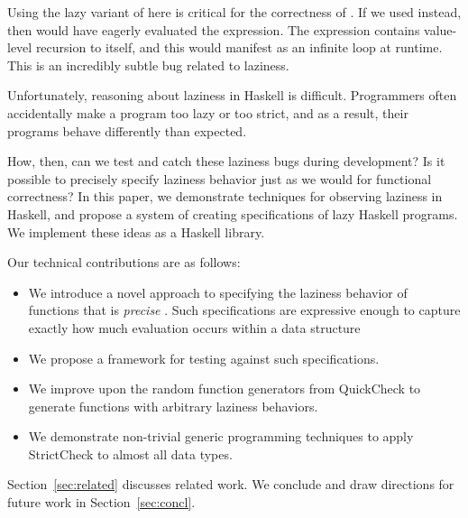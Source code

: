 \documentclass[acmsmall,review]{acmart}\settopmatter{}
\begin{document}
Using the lazy variant of  here is critical for the correctness
of . If we used  instead, then 
would have eagerly evaluated the  expression. The  expression
contains value-level recursion to itself, and this would manifest as an infinite
loop at runtime. This is an incredibly subtle bug related to laziness.

Unfortunately, reasoning about laziness in Haskell is difficult. Programmers
often accidentally make a program too lazy or too strict, and as a result, their
programs behave differently than expected.


How, then, can we test and catch these laziness bugs during development? Is it
possible to precisely specify laziness behavior just as we would for functional
correctness?
%
In this paper, we demonstrate techniques for observing laziness in Haskell, and
propose a system of creating specifications of lazy Haskell programs. We
implement these ideas as a Haskell library.

Our technical contributions are as follows:
\begin{itemize}
\item We introduce a novel approach to specifying the laziness behavior of functions that is
{\em precise} . Such specifications are
expressive enough to capture exactly how much evaluation occurs within
a data structure  
\item We propose a framework for testing against such specifications.
\item We improve upon the random function generators from QuickCheck to generate functions with arbitrary laziness behaviors.
\item We demonstrate non-trivial generic programming techniques to apply StrictCheck to almost all data types.
\end{itemize}
%
Section~\ref{sec:related} discusses related work. We conclude and draw
directions for future work in Section~\ref{sec:concl}.
\end{document}
